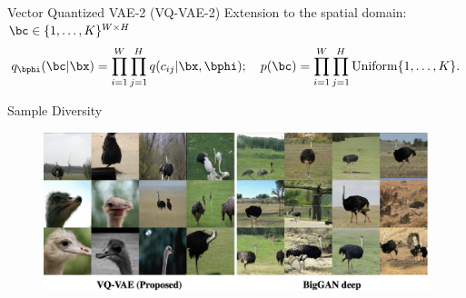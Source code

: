 \documentclass{beamer}
\begin{document}
\begin{frame}{Vector Quantized VAE-2 (VQ-VAE-2)}
	Extension to the spatial domain: $\bc \in \{1, \dots, K\}^{W \times H}$
	\vspace{-0.3cm}
	\[
		q_{\bphi}(\bc | \bx) = \prod_{i=1}^W \prod_{j=1}^H q(c_{ij} | \bx, \bphi); \quad p(\bc) = \prod_{i=1}^W \prod_{j=1}^H \text{Uniform}\{1, \dots, K\}.
	\]
	\vspace{-0.6cm}
	\begin{block}{Sample Diversity}
		\vspace{-0.2cm}
		\begin{figure}
			\centering
			\includegraphics[width=1.0\linewidth]{figs/vqvae2_diversity}
		\end{figure}
	\end{block}
\end{frame}
\end{document}
